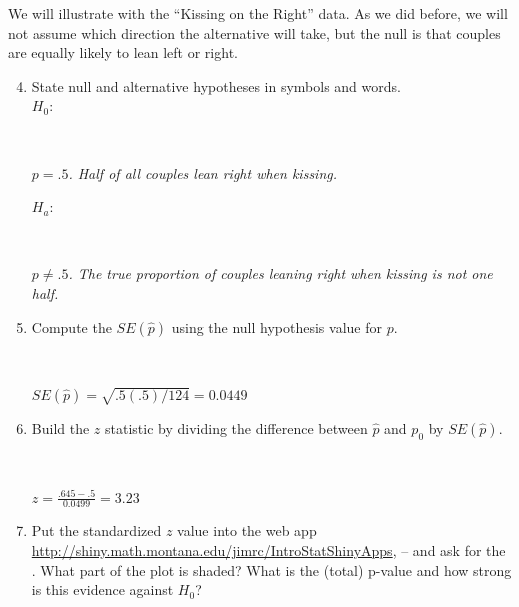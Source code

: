  We will illustrate with the ``Kissing on the Right'' data. As we did
 before, we will not assume which direction the alternative will
 take, but the null is that couples are equally likely to lean
 left or right. 
 
    \begin{enumerate}
\setcounter{enumi}{3}
    \item State null and alternative hypotheses in symbols and
      words.\\
      $H_0:$ 
\begin{students}
    \vspace{1.2cm}    \\
\end{students}
\begin{key} 
{\it $p = .5$.  Half of all couples lean right when kissing.}
\end{key}
$H_a:$
\begin{students}
    \vspace{.7cm}    \\
\end{students}

\begin{key} 
{\it $p \neq .5$.  The true proportion of couples leaning right when
  kissing is not one half.}
\end{key}
\item Compute the $SE(\widehat{p})$ using the null hypothesis value
  for $p$. 
\begin{students}
    \vspace{1cm}    \\
\end{students}

\begin{key} 
{\it $SE(\widehat{p}) = \sqrt{.5(.5)/124} = 0.0449$}
\end{key}

  \item Build the $z$ statistic by dividing the difference between
    $\widehat{p}$ and $p_0$ by $SE(\widehat{p})$. 
\begin{students}
    \vspace{1cm}    \\
\end{students}

\begin{key} 
{\it $z = \frac{.645 - .5}{0.0499} = 3.23$}
\end{key}

  \item Put the standardized $z$ value into the web app 
    \url{http://shiny.math.montana.edu/jimrc/IntroStatShinyApps},
     --  and ask for
    the .  What part of the plot is shaded?  What is
    the (total) p-value and how strong is this evidence against $H_0$?  
\begin{students}
    \vspace{1cm}    \\
\end{students}


\end{enumerate}
